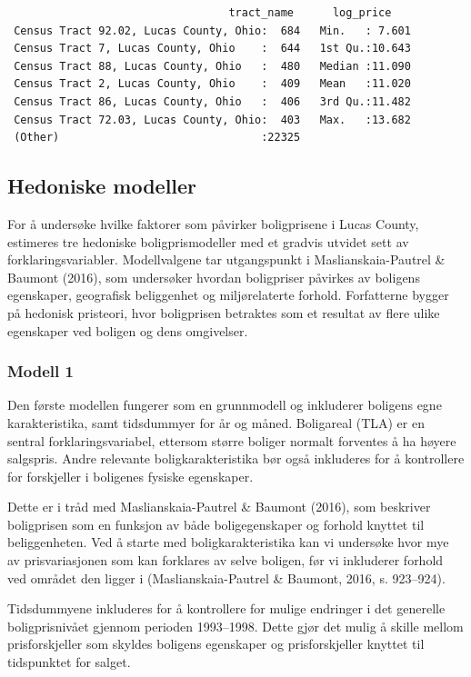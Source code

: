 \documentclass[
  norsk,
  a4paper,
]{article}
\begin{document}
\begin{verbatim}
                                  tract_name      log_price     
 Census Tract 92.02, Lucas County, Ohio:  684   Min.   : 7.601  
 Census Tract 7, Lucas County, Ohio    :  644   1st Qu.:10.643  
 Census Tract 88, Lucas County, Ohio   :  480   Median :11.090  
 Census Tract 2, Lucas County, Ohio    :  409   Mean   :11.020  
 Census Tract 86, Lucas County, Ohio   :  406   3rd Qu.:11.482  
 Census Tract 72.03, Lucas County, Ohio:  403   Max.   :13.682  
 (Other)                               :22325                   
\end{verbatim}

\subsection{Hedoniske modeller}\label{hedoniske-modeller}

For å undersøke hvilke faktorer som påvirker boligprisene i Lucas
County, estimeres tre hedoniske boligprismodeller med et gradvis utvidet
sett av forklaringsvariabler. Modellvalgene tar utgangspunkt i
Maslianskaia-Pautrel \& Baumont (2016), som undersøker hvordan
boligpriser påvirkes av boligens egenskaper, geografisk beliggenhet og
miljørelaterte forhold. Forfatterne bygger på hedonisk pristeori, hvor
boligprisen betraktes som et resultat av flere ulike egenskaper ved
boligen og dens omgivelser.

\subsubsection{Modell 1}\label{modell-1}

Den første modellen fungerer som en grunnmodell og inkluderer boligens
egne karakteristika, samt tidsdummyer for år og måned. Boligareal (TLA)
er en sentral forklaringsvariabel, ettersom større boliger normalt
forventes å ha høyere salgspris. Andre relevante boligkarakteristika bør
også inkluderes for å kontrollere for forskjeller i boligenes fysiske
egenskaper.

Dette er i tråd med Maslianskaia-Pautrel \& Baumont (2016), som
beskriver boligprisen som en funksjon av både boligegenskaper og forhold
knyttet til beliggenheten. Ved å starte med boligkarakteristika kan vi
undersøke hvor mye av prisvariasjonen som kan forklares av selve
boligen, før vi inkluderer forhold ved området den ligger i
(Maslianskaia-Pautrel \& Baumont, 2016, s. 923--924).

Tidsdummyene inkluderes for å kontrollere for mulige endringer i det
generelle boligprisnivået gjennom perioden 1993--1998. Dette gjør det
mulig å skille mellom prisforskjeller som skyldes boligens egenskaper og
prisforskjeller knyttet til tidspunktet for salget.
\end{document}
